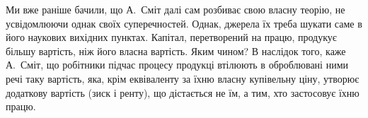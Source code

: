 Ми вже раніше бачили, що А.~Сміт далі сам розбиває свою власну
теорію, не усвідомлюючи однак своїх суперечностей. Однак, джерела їх
треба шукати саме в його наукових вихідних пунктах. Капітал, перетворений
на працю, продукує більшу вартість, ніж його власна вартість.
Яким чином? В наслідок того, каже А.~Сміт, що робітники підчас процесу
продукці втілюють в оброблювані ними речі таку вартість, яка,
крім еквіваленту за їхню власну купівельну ціну, утворює додаткову вартість
(зиск і ренту), що дістається не їм, а тим, хто застосовує їхню працю.
\parbreak{}  %
